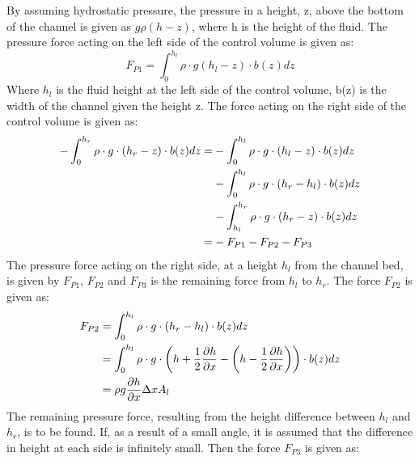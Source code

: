 By assuming hydrostatic pressure, the pressure in a height, z, above the bottom of the channel is given as $g\rho(h-z)$, where h is the height of the fluid.  
The pressure force acting on the left side of the control volume is given as:
\begin{equation}\label{eq:P1}
	F_{P1} = \int_{0}^{h_l} \rho \cdot g (h_l - z)\cdot b(z) dz
\end{equation}
Where $h_l$ is the fluid height at the left side of the control volume, b(z) is the width of the channel given the height z. The force acting on the right side of the control volume is given as:
\begin{equation}\label{eq:P2}
\begin{aligned}
	-\int_{0}^{h_r} \rho \cdot g \cdot(h_r - z)\cdot b(z)dz = 
	&-\int_{0}^{h_l} \rho \cdot g \cdot(h_l - z)\cdot b(z)dz \vspace{2mm}\\ 
	&-\int_{0}^{h_l} \rho \cdot g \cdot(h_r- h_l)\cdot b(z)dz \vspace{2mm}\\
	&-\int_{h_l}^{h_r} \rho \cdot g \cdot(h_r - z)\cdot b(z)dz \vspace{4mm}\\
	=&-F_{P1} - F_{P2} - F_{P3}
\end{aligned}	
\end{equation}
The pressure force acting on the right side, at a height $h_l$ from the channel bed, is given by $F_{P1}$, $F_{P2}$ and $F_{P3}$ is the remaining force from $h_l$ to $h_r$. The force $F_{P2}$ is given as:
\begin{equation}
\begin{aligned}
	F_{P2} &= \int_{0}^{h_l} \rho \cdot g \cdot (h_r - h_l)\cdot b(z)dz \vspace{2mm}\\
	&=  \int_{0}^{h_l} \rho \cdot g \cdot \left(h + \frac{1}{2} \frac{\partial h}{\partial x} - \left(h - \frac{1}{2} \frac{\partial h}{\partial x}\right)\right)\cdot b(z)dz \vspace{2mm}\\
	&= \rho g \frac{\partial h}{\partial x}\Delta x A_l
\end{aligned}
\end{equation}
The remaining pressure force, resulting from the height difference between $h_l$ and $h_r$, is to be found. If, as a result of a small angle, it is assumed that the difference in height at each side is infinitely small. Then the force $F_{P3}$ is given as:
